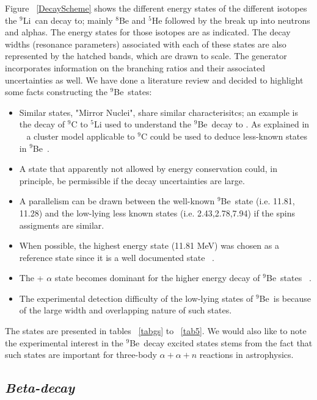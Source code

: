 \documentclass{JINST}
\newcommand{\li}{$^{9}$Li~}
\newcommand{\beNINE}{$^{9}$Be~}
\begin{document}
Figure ~\ref{DecayScheme} shows the different energy states of the different
isotopes the \li can decay to; mainly $^8$Be and $^5$He followed by the break up
into neutrons and alphas. The energy states for those isotopes are as indicated.
The decay widths (resonance parameters) associated with each of these states are
also represented by the hatched bands, which are drawn to scale. The generator
incorporates information on the branching ratios and their associated
uncertainties as well. We have done a literature review and decided to highlight some facts constructing the \beNINE states:
\begin{itemize}
 \item  Similar states, "Mirror Nuclei", share similar characterisitcs; an example is the decay of $^{9}$C to $^{5}$Li used 
 to understand the \beNINE decay to \heFIVE. As explained in ~\cite{PhysRevC.75.045803} a cluster model applicable to $^{9}$C could be used to deduce less-known
 states in \beNINE.
 \item A state that apparently not allowed by energy conservation could, in principle, be permissible 
 if the decay uncertainties are large.
 \item A parallelism can be drawn between the well-known \beNINE state (i.e. 11.81, 11.28) and the low-lying less known states 
 (i.e. 2.43,2.78,7.94) if the spins assigments are similar.
 \item When possible, the highest energy state (11.81 MeV) was chosen as a reference state since it is a well documented state ~\cite{Prezado200355}.
 \item The \heFIVE + $\alpha$ state becomes dominant for the higher energy decay of \beNINE states ~\cite{Descouv}. 
 \item The experimental detection difficulty of the low-lying states of \beNINE is because of the large width and overlapping nature of such states.
 
 
\end{itemize}


The states are presented in tables ~\ref{tabgs} to ~\ref{tab5}. We would also like to note the experimental interest in the \beNINE decay excited states stems from the fact that such states are important for three-body 
$ \alpha + \alpha +n $ reactions in astrophysics.

\subsection*{\it Beta-decay}
\end{document}
